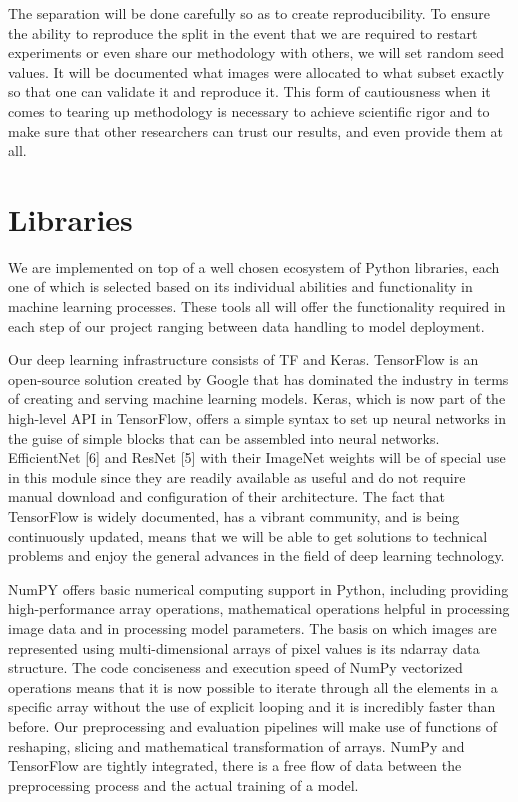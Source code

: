 \documentclass[12pt, openany]{report}
\begin{document}
The separation will be done carefully so as to create reproducibility. To ensure the ability to reproduce the split in the event that we are required to restart experiments or even share our methodology with others, we will set random seed values. It will be documented what images were allocated to what subset exactly so that one can validate it and reproduce it. This form of cautiousness when it comes to tearing up methodology is necessary to achieve scientific rigor and to make sure that other researchers can trust our results, and even provide them at all.

\section{Libraries}
We are implemented on top of a well chosen ecosystem of Python libraries, each one of which is selected based on its individual abilities and functionality in machine learning processes. These tools all will offer the functionality required in each step of our project ranging between data handling to model deployment.

Our deep learning infrastructure consists of TF and Keras. TensorFlow is an open-source solution created by Google that has dominated the industry in terms of creating and serving machine learning models. Keras, which is now part of the high-level API in TensorFlow, offers a simple syntax to set up neural networks in the guise of simple blocks that can be assembled into neural networks. EfficientNet [6] and ResNet [5] with their ImageNet weights will be of special use in this module since they are readily available as useful and do not require manual download and configuration of their architecture. The fact that TensorFlow is widely documented, has a vibrant community, and is being continuously updated, means that we will be able to get solutions to technical problems and enjoy the general advances in the field of deep learning technology.

NumPY offers basic numerical computing support in Python, including providing high-performance array operations, mathematical operations helpful in processing image data and in processing model parameters. The basis on which images are represented using multi-dimensional arrays of pixel values is its ndarray data structure. The code conciseness and execution speed of NumPy vectorized operations means that it is now possible to iterate through all the elements in a specific array without the use of explicit looping and it is incredibly faster than before. Our preprocessing and evaluation pipelines will make use of functions of reshaping, slicing and mathematical transformation of arrays. NumPy and TensorFlow are tightly integrated, there is a free flow of data between the preprocessing process and the actual training of a model.
\end{document}

